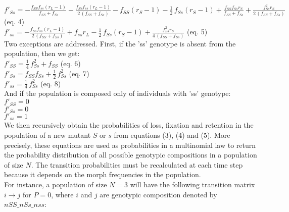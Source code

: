\documentclass{article}
\begin{document}
$f'_{\mathit{Ss}} = -\frac{f_{\mathit{SS}} f_{\mathit{ss}} {\left(r_{L} - 1\right)}}{f_{\mathit{SS}} + f_{\mathit{Ss}}} - \frac{f_{\mathit{Ss}} f_{\mathit{ss}} {\left(r_{L} - 1\right)}}{2 \, {\left(f_{\mathit{SS}} + f_{\mathit{Ss}}\right)}} - f_{\mathit{SS}} {\left(r_{S} - 1\right)} - \frac{1}{2} \, f_{\mathit{Ss}} {\left(r_{S} - 1\right)} + \frac{f_{\mathit{SS}} f_{\mathit{Ss}} r_{S}}{f_{\mathit{SS}} + f_{\mathit{Ss}}} + \frac{f_{\mathit{Ss}}^{2} r_{S}}{2 \, {\left(f_{\mathit{SS}} + f_{\mathit{Ss}}\right)}}$ (eq. 4)\\
 
$f'_{\mathit{ss}} = -\frac{f_{\mathit{Ss}} f_{\mathit{ss}} {\left(r_{L} - 1\right)}}{2 \, {\left(f_{\mathit{SS}} + f_{\mathit{Ss}}\right)}} + f_{\mathit{ss}} r_{L} - \frac{1}{2} \, f_{\mathit{Ss}} {\left(r_{S} - 1\right)} + \frac{f_{\mathit{Ss}}^{2} r_{S}}{4 \, {\left(f_{\mathit{SS}} + f_{\mathit{Ss}}\right)}}$ (eq. 5)\\

\newline
Two exceptions are addressed. First, if the 'ss' genotype is absent from the population, then we get:\\
$f'_{\mathit{SS}} = \frac{1}{4} \, f_{\mathit{Ss}}^{2} + f_{\mathit{SS}}$ (eq. 6)\\
$f'_{\mathit{Ss}} = f_{\mathit{SS}} f_{\mathit{Ss}} + \frac{1}{2} \, f_{\mathit{Ss}}^{2}$ (eq. 7)\\
$f'_{\mathit{ss}} = \frac{1}{4} \, f_{\mathit{Ss}}^{2}$ (eq. 8)\\

And if the population is composed only of individuals with 'ss' genotype:\\
$f'_{\mathit{SS}} = 0$\\
$f'_{\mathit{Ss}} = 0$\\
$f'_{\mathit{ss}} = 1$\\


We then recursively obtain the probabilities of loss, fixation and retention in the population of a new mutant $S$ or $s$ from equations (3), (4) and (5). More precisely, these equations are used as probabilities in a multinomial law to return the probability distribution of all possible genotypic compositions in a population of size $N$. The transition probabilities must be recalculated at each time step because it depends on the morph frequencies in the population.\\
For instance, a population of size $N=3$ will have the following transition matrix $i \rightarrow j$ for $P=0$, where $i$ and $j$ are genotypic composition denoted by $nSS\_nSs\_nss$:\\
\end{document}
